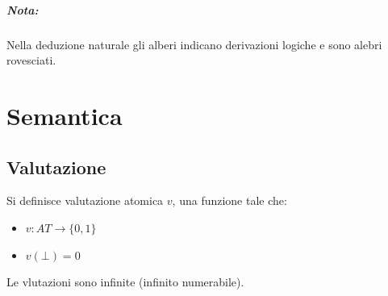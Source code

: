 \documentclass[a4paper,12pt]{report}
\begin{document}
\paragraph{Nota:} Nella deduzione naturale gli alberi indicano derivazioni logiche e sono alebri rovesciati. 

\chapter{Semantica}
\section{Valutazione}
Si definisce valutazione atomica $v$, una funzione tale che:
\begin{itemize}
\item $v: AT \to \{0, 1\}$
\item $v(\bot) = 0$
\end{itemize}
Le vlutazioni sono infinite (infinito numerabile).
\end{document}
